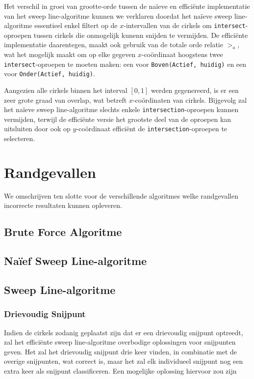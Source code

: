 \documentclass[12pt]{article}
\begin{document}
Het verschil in groei van grootte-orde tussen de naïeve en efficiënte implementatie van het sweep line-algoritme kunnen we verklaren doordat het naïeve sweep line-algoritme essentieel enkel filtert op de $x$-intervallen van de cirkels om \texttt{intersect}-oproepen tussen cirkels die onmogelijk kunenn snijden te vermijden. De efficiënte implementatie daarentegen, maakt ook gebruik van de totale orde relatie $>_a$, wat het mogelijk maakt om op elke gegeven $x$-coördinaat hoogstens twee \texttt{intersect}-oproepen te moeten maken: een voor \texttt{Boven(Actief, huidig)} en een voor \texttt{Onder(Actief, huidig)}.

 Aangezien alle cirkels binnen het interval $[0,1]$ werden gegenereerd, is er een zeer grote graad van overlap, wat betreft $x$-coördinaten van cirkels. Bijgevolg zal het naïeve sweep line-algoritme slechts enkele \texttt{intersection}-oproepen kunnen vermijden, terwijl de efficiënte versie het grootste deel van de oproepen kan uitsluiten door ook op $y$-coördinaat efficiënt de \texttt{intersection}-oproepen te selecteren.

\section{Randgevallen}
We omschrijven ten slotte voor de verschillende algoritmes welke randgevallen incorrecte resultaten kunnen opleveren.

\subsection{Brute Force Algoritme}

\subsection{Naïef Sweep Line-algoritme}

\subsection{Sweep Line-algoritme}
\subsubsection{Drievoudig Snijpunt}
Indien de cirkels zodanig geplaatst zijn dat er een drievoudig snijpunt optreedt, zal het efficiënte sweep line-algoritme overbodige oplossingen voor snijpunten geven. Het zal het drievoudig snijpunt drie keer vinden, in combinatie met de overige snijpunten, wat correct is, maar het zal elk individueel snijpunt nog een extra keer als snijpunt classificeren. Een mogelijke oplossing hiervoor zou zijn %
\end{document}
